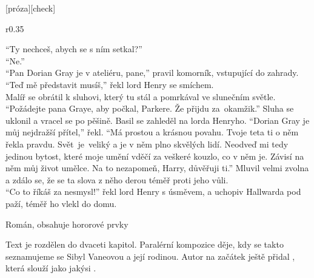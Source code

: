 \documentclass{extarticle} %
\begin{document}
[próza][check]

\noindent\begin{wrapfigure}{r}{0.35\textwidth}
\tiny

\setlength{\parindent}{3pt}
\noindent
\enquote{Ty nechceš, abych se s ním setkal?} \\
\enquote{Ne.} \\
\enquote{Pan Dorian Gray je v ateliéru, pane,} pravil komorník, vstupující do zahrady. \\
\enquote{Teď mě představit musíš,} řekl lord Henry se smíchem. \\
Malíř se obrátil k sluhovi, který tu stál a pomrkával ve slunečním světle.
\enquote{Požádejte pana Graye, aby počkal, Parkere. Že přijdu za~okamžik.}
Sluha se uklonil a vracel se po pěšině.
Basil se zahleděl na lorda Henryho.
\enquote{Dorian Gray je můj nejdražší přítel,} řekl.
\enquote{Má prostou a krásnou povahu.
Tvoje teta ti o něm řekla pravdu.
Svět~je~veliký a je v něm plno skvělých lidí.
Neodveď mi tedy jedinou bytost, které moje umění vděčí za veškeré kouzlo, co v něm je.
Závisí na něm můj život umělce.
Na to nezapomeň, Harry, důvěřuji ti.}
Mluvil velmi zvolna a zdálo se, že se ta slova z něho derou téměř proti jeho vůli. \\
\enquote{Co to říkáš za nesmysl!} řekl lord Henry s úsměvem, a uchopiv Hallwarda pod paží,
téměř ho vlekl do domu. 
\end{wrapfigure}


\noindent
Román, obsahuje hororové prvky





\noindent 
Text je rozdělen do dvaceti kapitol.
Paralérní kompozice děje, kdy se takto seznamujeme se Sibyl Vaneovou a její rodinou.
Autor na začátek ještě přidal , která slouží jako jakýsi .
\end{document}

